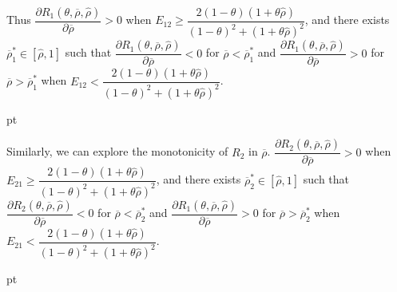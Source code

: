 \documentclass[10pt]{article}
\begin{document}
Thus {\footnotesize $ \dfrac{\partial R_1 (\theta, \overline{\rho}, {\hat \rho})}{\partial \overline{\rho}} > 0 $} when {\footnotesize $ E_{1 2} \geqslant \dfrac{2 (1 - \theta) (1 + \theta \hat{\rho})}{(1 - \theta)^2 + (1 + \theta\hat{\rho})^2} $}, and there exists {\footnotesize $ \overline{\rho}_1^* \in [{\hat \rho}, 1] $} such that {\footnotesize $ \dfrac{\partial R_1 (\theta, \overline{\rho}, {\hat \rho})}{\partial \overline{\rho}} < 0 $} for {\footnotesize $ \overline{\rho} < \overline{\rho}_1^* $} and {\footnotesize $ \dfrac{\partial R_1 (\theta, \overline{\rho}, {\hat \rho})}{\partial \overline{\rho}} > 0 $} for {\footnotesize $ \overline{\rho} > \overline{\rho}_1^* $} when {\footnotesize $ E_{1 2} < \dfrac{2 (1 - \theta) (1 + \theta \hat{\rho})}{(1 - \theta)^2 + (1 + \theta\hat{\rho})^2} $}. 

 pt

Similarly, we can explore the monotonicity of $ R_2 $ in $ \overline{\rho} $.
{\footnotesize $ \dfrac{\partial R_2 (\theta, \overline{\rho}, {\hat \rho})}{\partial \overline{\rho}} > 0 $} when {\footnotesize $ E_{2 1} \geqslant \dfrac{2 (1 - \theta) (1 + \theta \hat{\rho})}{(1 - \theta)^2 + (1 + \theta\hat{\rho})^2} $}, and there exists {\footnotesize $ \overline{\rho}_2^* \in [{\hat \rho}, 1] $} such that {\footnotesize $ \dfrac{\partial R_2 (\theta, \overline{\rho}, {\hat \rho})}{\partial \overline{\rho}} < 0 $} for {\footnotesize $ \overline{\rho} < \overline{\rho}_2^* $} and {\footnotesize $ \dfrac{\partial R_1 (\theta, \overline{\rho}, {\hat \rho})}{\partial \overline{\rho}} > 0 $} for {\footnotesize $ \overline{\rho} > \overline{\rho}_2^* $} when {\footnotesize $ E_{2 1} < \dfrac{2 (1 - \theta) (1 + \theta \hat{\rho})}{(1 - \theta)^2 + (1 + \theta\hat{\rho})^2} $}. 





 pt
\end{document}
